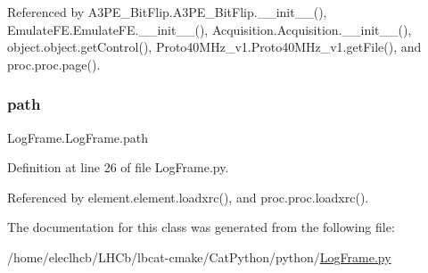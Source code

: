 Referenced by A3\+P\+E\+\_\+\+Bit\+Flip.\+A3\+P\+E\+\_\+\+Bit\+Flip.\+\_\+\+\_\+init\+\_\+\+\_\+(), Emulate\+F\+E.\+Emulate\+F\+E.\+\_\+\+\_\+init\+\_\+\+\_\+(), Acquisition.\+Acquisition.\+\_\+\+\_\+init\+\_\+\+\_\+(), object.\+object.\+get\+Control(), Proto40\+M\+Hz\+\_\+v1.\+Proto40\+M\+Hz\+\_\+v1.\+get\+File(), and proc.\+proc.\+page().

\mbox{\label{classLogFrame_1_1LogFrame_a851670425cc5380695a0790467740716}} 
\subsubsection{\texorpdfstring{path}{path}}
{\footnotesize\ttfamily Log\+Frame.\+Log\+Frame.\+path}



Definition at line 26 of file Log\+Frame.\+py.



Referenced by element.\+element.\+loadxrc(), and proc.\+proc.\+loadxrc().



The documentation for this class was generated from the following file\+:\begin{DoxyCompactItemize}
\item 
/home/eleclhcb/\+L\+H\+Cb/lbcat-\/cmake/\+Cat\+Python/python/\hyperlink{LogFrame_8py}{Log\+Frame.\+py}\end{DoxyCompactItemize}
